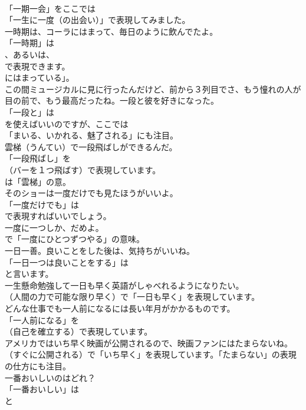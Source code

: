 \documentclass[8pt]{extreport}
\begin{document}
\begin{CJK}{UTF8}{min}
\\	「一期一会」をここでは
\\	「一生に一度（の出会い）」で表現してみました。	
\\	一時期は、コーラにはまって、毎日のように飲んでたよ。 
\\	「一時期」は
\\	、あるいは、
\\	で表現できます。
\\	にはまっている」。	
\\	この間ミュージカルに見に行ったんだけど、前から３列目でさ、もう憧れの人が目の前で、もう最高だったね。一段と彼を好きになった。 
\\	「一段と」は
\\	を使えばいいのですが、ここでは
\\	「まいる、いかれる、魅了される」にも注目。	
\\	雲梯（うんてい）で一段飛ばしができるんだ。 
\\	「一段飛ばし」を 
\\	（バーを１つ飛ばす）で表現しています。
\\	は「雲梯」の意。	
\\	そのショーは一度だけでも見たほうがいいよ。 
\\	「一度だけでも」は 
\\	で表現すればいいでしょう。	
\\	一度に一つしか、だめよ。 
\\	で「一度にひとつずつやる」の意味。	
\\	一日一善。良いことをした後は、気持ちがいいね。 
\\	「一日一つは良いことをする」は
\\	と言います。	
\\	一生懸命勉強して一日も早く英語がしゃべれるようになりたい。 
\\	（人間の力で可能な限り早く）で「一日も早く」を表現しています。	
\\	どんな仕事でも一人前になるには長い年月がかかるものです。 
\\	「一人前になる」を 
\\	（自己を確立する）で表現しています。	
\\	アメリカではいち早く映画が公開されるので、映画ファンにはたまらないね。 
\\	（すぐに公開される）で「いち早く」を表現しています。「たまらない」の表現の仕方にも注目。	
\\	一番おいしいのはどれ？ 
\\	「一番おいしい」は 
\\	と 

\end{CJK}
\end{document}
